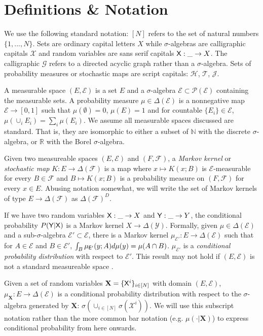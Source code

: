 \section{Definitions \& Notation}\label{sec:dfin}

We use the following standard notation: $[N]$ refers to the set of natural numbers $\{1,...,N\}$. Sets are ordinary capital letters $X$ while $\sigma$-algebras are calligraphic capitals $\mathcal{X}$ and random variables are sans serif capitals $\mathsf{X}:\_\to X$. The calligraphic $\mathcal{G}$ refers to a directed acyclic graph rather than a $\sigma$-algebra. Sets of probability measures or stochastic maps are script capitals: $\mathscr{H}$, $\mathscr{T}$, $\mathscr{J}$.

A measurable space $(E,\mathcal{E})$ is a set $E$ and a $\sigma$-algebra $\mathcal{E}\subset\mathcal{P}(\mathcal{E})$ containing the measurable sets. A probability measure $\mu\in \Delta(\mathcal{E})$ is a nonnegative map $\mathcal{E}\to[0,1]$ such that $\mu(\emptyset)=0$, $\mu(E)=1$ and for countable $\{E_i\}\in \mathcal{E}$, $\mu(\cup_i E_i) = \sum_i \mu(E_i)$. We assume all measurable spaces discussed are standard. That is, they are isomorphic to either a subset of $\mathbb{N}$ with the discrete $\sigma$-algebra, or $\mathbb{R}$ with the Borel $\sigma$-algebra.

Given two measureable spaces $(E,\mathcal{E})$ and $(F,\mathcal{F})$, a \emph{Markov kernel} or \emph{stochastic map} $K:E\to \Delta(\mathcal{F})$ is a map where $x\mapsto K(x;B)$ is $\mathcal{E}$-measurable for every $B\in\mathcal{F}$ and $B\mapsto K(x;B)$ is a probability measure on $(F,\mathcal{F})$ for every $x\in E$. Abusing notation somewhat, we will write the set of Markov kernels of type $E\to \Delta(\mathcal{F})$ as $\Delta(\mathcal{F})^D$. 

If we have two random variables $\mathsf{X}:\_\to X$ and $\mathsf{Y}:\_\to Y$, the conditional probability $P(\mathsf{Y}|\mathsf{X})$ is a Markov kernel $X\to \Delta(\mathcal{Y})$. Formally, given $\mu\in \Delta(\mathcal{E})$ and a sub-$\sigma$-algebra $\mathcal{E}'\subset\mathcal{E}$, there is a Markov kernel $\mu_{\mathcal{E}'}:E\to\Delta(\mathcal{E})$ such that for $A\in\mathcal{E}$ and $B\in \mathcal{E}'$, $\int_B \mu_{\mathsf{E}'}(y;A) d\mu(y) = \mu(A\cap B)$. $\mu_{\mathcal{E}'}$ is a \emph{conditional probability distribution} with respect to $\mathcal{E}'$. This result may not hold if $(E,\mathcal{E})$ is not a standard measureable space \citep{cinlar_probability_2011}.

Given a set of random variables $\mathbf{X}=\{\mathsf{X}^i\}_{i\in [N]}$ with domain $(E,\mathcal{E})$, $\mu_{\mathbf{X}}:E\to \Delta(\mathcal{E})$ is a conditional probability distribution with respect to the $\sigma$-algebra generated by $\mathbf{X}$: $\sigma(\cup_{i\in[N]}\sigma(\mathcal{X}^i))$.  We will use this subscript notation rather than the more common bar notation (e.g. $\mu(\cdot|\mathbf{X})$) to express conditional probability from here onwards.

